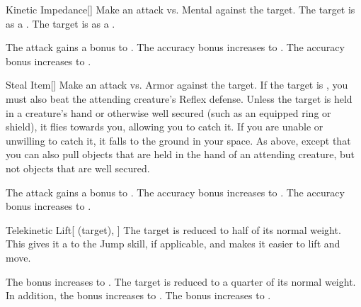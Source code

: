 \lowercase{\hypertarget{spell:Kinetic Impedance}{}}\label{spell:Kinetic Impedance}
\begin{freeability}[Rank 1]{\hypertarget{spell:Kinetic Impedance}{Kinetic Impedance}}[]
Make an attack vs. Mental against the target.
\hit The target is  as a .
\crit The target is  as a .

\rankline
{} The attack gains a  bonus to .
 The accuracy bonus increases to .
 The accuracy bonus increases to .
\end{freeability}
\vspace{0.25em}



\lowercase{\hypertarget{spell:Steal Item}{}}\label{spell:Steal Item}
\begin{freeability}[Rank 1]{\hypertarget{spell:Steal Item}{Steal Item}}[]
Make an attack vs. Armor against the target.
If the target is , you must also beat the attending creature's Reflex defense.
\hit Unless the target is held in a creature's hand or otherwise well secured (such as an equipped ring or shield), it flies towards you, allowing you to catch it.
If you are unable or unwilling to catch it, it falls to the ground in your space.
\crit As above, except that you can also pull objects that are held in the hand of an attending creature, but not objects that are well secured.

\rankline
{} The attack gains a  bonus to .
 The accuracy bonus increases to .
 The accuracy bonus increases to .
\end{freeability}
\vspace{0.25em}



\lowercase{\hypertarget{spell:Telekinetic Lift}{}}\label{spell:Telekinetic Lift}
\begin{attuneability}[Rank 1]{\hypertarget{spell:Telekinetic Lift}{Telekinetic Lift}}[ (target), ]
The target is reduced to half of its normal weight.
This gives it a   to the Jump skill, if applicable, and makes it easier to lift and move.

\rankline
{} The bonus increases to .
 The target is reduced to a quarter of its normal weight. In addition, the bonus increases to .
 The bonus increases to .
\end{attuneability}
\vspace{0.25em}



